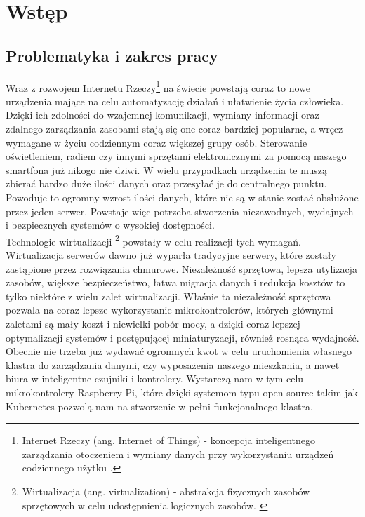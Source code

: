 \documentclass[12pt]{report}
\let\Oldsection\section
\renewcommand{\section}{\FloatBarrier\Oldsection}
\begin{document}


\tableofcontents    %

\chapter{Wstęp}\label{chap:wstep}
\section{Problematyka i zakres pracy}
Wraz z rozwojem Internetu Rzeczy\footnote{Internet Rzeczy (ang. Internet of Things) - koncepcja inteligentnego zarządzania otoczeniem i wymiany danych przy wykorzystaniu urządzeń codziennego użytku \cite{iot}.} na świecie powstają coraz to nowe urządzenia mające na celu automatyzację działań i ułatwienie życia człowieka. Dzięki ich zdolności do wzajemnej komunikacji, wymiany informacji oraz zdalnego zarządzania zasobami stają się one coraz bardziej popularne, a wręcz wymagane w życiu codziennym coraz większej grupy osób. Sterowanie oświetleniem, radiem czy innymi sprzętami elektronicznymi za pomocą naszego smartfona już nikogo nie dziwi. W wielu przypadkach urządzenia te muszą zbierać bardzo duże ilości danych oraz przesyłać je do centralnego punktu. Powoduje to ogromny wzrost ilości danych, które nie są w stanie zostać obsłużone przez jeden serwer. Powstaje więc potrzeba stworzenia niezawodnych, wydajnych i bezpiecznych systemów o wysokiej dostępności. \\
\indent Technologie wirtualizacji
\footnote{Wirtualizacja (ang. virtualization) - abstrakcja fizycznych zasobów sprzętowych w celu udostępnienia logicznych zasobów. \cite{virtualization}}
powstały w celu realizacji tych wymagań. Wirtualizacja serwerów dawno już wyparła tradycyjne serwery, które zostały zastąpione przez rozwiązania chmurowe. Niezależność sprzętowa, lepsza utylizacja zasobów, większe bezpieczeństwo, łatwa migracja danych i redukcja kosztów to tylko niektóre z wielu zalet wirtualizacji. Właśnie ta niezależność sprzętowa pozwala na coraz lepsze wykorzystanie mikrokontrolerów, których głównymi zaletami są mały koszt i niewielki pobór mocy, a dzięki coraz lepszej optymalizacji systemów i postępującej miniaturyzacji, również rosnąca wydajność. \\
	\indent Obecnie nie trzeba już wydawać ogromnych kwot w celu uruchomienia własnego klastra do zarządzania danymi, czy wyposażenia naszego mieszkania, a nawet biura w inteligentne czujniki i kontrolery. Wystarczą nam w tym celu mikrokontrolery Raspberry Pi, które dzięki systemom typu open source takim jak Kubernetes pozwolą nam na stworzenie w pełni funkcjonalnego klastra. \\
\end{document}
